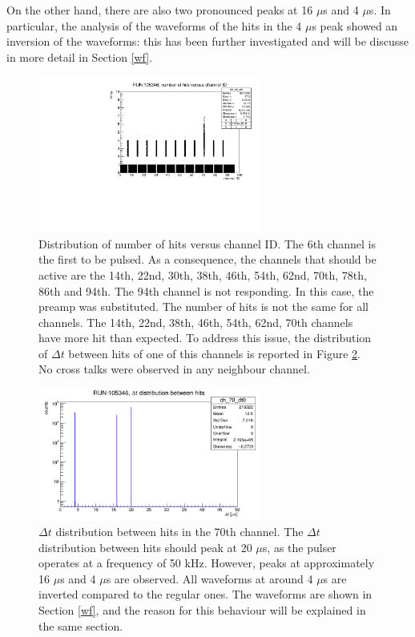 On the other hand, there are also two pronounced peaks at 16 $\mu$s and 4 $\mu$s. 
In particular, the analysis of the waveforms of the hits in the 4 $\mu$s peak 
showed an inversion of the waveforms: this has been further investigated 
and will be discusse in more detail in Section \ref{wf}.
\begin{figure}[!h]
  \centering
  \includegraphics[width=0.65\textwidth]{figures/pdf/run105346_nh_vs_ch.pdf}
  \caption{Distribution of number of hits versus channel ID. 
  The 6th channel is the first to be pulsed.
  As a consequence, the channels that should be active are the 
  14th, 22nd, 30th, 38th, 46th, 54th, 62nd, 70th, 78th, 86th and 94th. 
  The 94th channel is not responding. In this case, the preamp 
  was substituted. The number of hits is not the same 
  for all channels. The 14th, 22nd, 38th, 46th, 54th, 62nd, 
  70th channels have more hit than expected.
  To address this issue, the distribution of $\Delta t$ between 
  hits of one of this channels is reported in Figure \ref{fig:deltatnhits}.
  No cross talks were observed in any neighbour channel.}
 \label{fig:dead}
\end{figure}


\begin{figure}[!h]
  \centering
  \includegraphics[width=0.65\textwidth]{figures/png/deltathits.png}
  \caption{$\Delta t$ distribution between hits in the 70th channel. The $\Delta t$ distribution between hits 
  should peak at 20 $\mu$s, as the pulser operates at a frequency of 50 kHz. However, peaks at approximately 
  16 $\mu$s and 4 $\mu$s are observed. All waveforms at around 4 $\mu$s are inverted compared to the regular ones. 
  The waveforms are shown in Section \ref{wf}, and the reason for this behaviour will be explained in the same section.}
 \label{fig:deltatnhits}
\end{figure}


